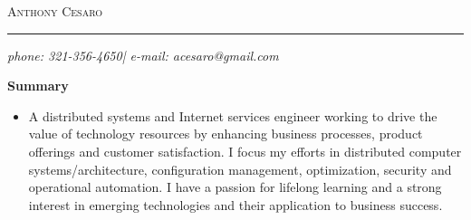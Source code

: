 \documentclass[10pt,oneside]{article}
\makeatletter
\newcommand{\name}{Anthony Cesaro}
\newcommand{\email}{acesaro@gmail.com}
\newcommand{\phone}{321-356-4650}
\newcommand{\bigname}[1]{
  \begin{flushleft}\selectfont\Large\scshape#1\end{flushleft}
}
\newenvironment{ressection}[1]{
  \vspace{4pt}
  \textbf{\selectfont\normalsize#1}
  \begin{itemize}
  \vspace{3pt}
}{
  \end{itemize}
}
\newcommand{\resitem}[1]{
  \vspace{-4pt}
  \item \begin{flushleft} #1 \end{flushleft}
}
\makeatother
\begin{document}
 \selectfont

\bigname{\name}

\vspace{-4pt} \rule{\textwidth}{1pt}

\vspace{-1pt} {\small\itshape \hfill phone: \phone | e-mail: \email}

\vspace{8 pt}


\begin{ressection}{Summary}

  \resitem{A distributed systems and Internet services engineer working to drive the value of technology resources by enhancing business processes, product offerings and customer satisfaction.  I focus my efforts in distributed computer systems/architecture, configuration management, optimization, security and operational automation.  I have a passion for lifelong learning and a strong interest in emerging technologies and their application to business success.}

\end{ressection}

\end{document}
